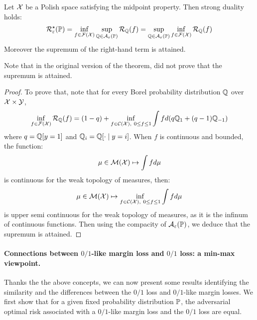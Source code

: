 \begin{thm}
\label{thm:eq01loss}
Let $\mathcal{X}$ be a Polish space satisfying the midpoint property. Then strong duality holds:
\begin{align*}
\mathcal{R}^\star_\varepsilon(\mathbb{P}) = \inf_{f\in\mathcal{F}(\mathcal{X})}\sup_{\mathbb{Q}\in\mathcal{A}_\varepsilon(\mathbb{P})} \mathcal{R}_{\mathbb{Q}}(f) =    \sup_{\mathbb{Q}\in\mathcal{A}_\varepsilon(\mathbb{P})} \inf_{f\in\mathcal{F}(\mathcal{X})} \mathcal{R}_{\mathbb{Q}}(f)
\end{align*}
Moreover the supremum of the right-hand term is attained. 
\end{thm}
Note that in the original version of the theorem, \citet{pydi2021many} did not prove that the supremum is attained. 
\begin{proof}
    To prove that, note that for every Borel probability distribution $\mathbb{Q}$ over $\mathcal{X}\times\mathcal{Y}$,
\begin{align*}
    \inf_{f\in\mathcal{F}(\mathcal{X})} \mathcal{R}_{\mathbb{Q}}(f) = (1-q)+\inf_{f\in\mathcal{C}(\mathcal{X}),~0\leq f\leq 1} \int f d(q\mathbb{Q}_1 +(q-1)\mathbb{Q}_{-1})
\end{align*}
where $q =\mathbb{Q}[y=1]$ and $\mathbb{Q}_i = \mathbb{Q}[\cdot\mid y=i]$. When $f$ is continuous and bounded, the function:
\begin{align*}
   \mu\in\mathcal{M}(\mathcal{X})\mapsto\int f d\mu
\end{align*}
is continuous for the weak topology of measures, then: 
\begin{align*}
    \mu\in\mathcal{M}(\mathcal{X})\mapsto\inf_{f\in\mathcal{C}(\mathcal{X}),~0\leq f\leq 1}\int f d\mu 
\end{align*}
is upper semi continuous for the weak topology of measures, as it is the infinum of continuous functions. Then using the compacity of $\mathcal{A}_\varepsilon(\mathbb{P})$, we deduce that the supremum is attained.
\end{proof}



\paragraph{Connections between $0/1$-like margin loss and $0/1$ loss: a min-max viewpoint.} Thanks the the above concepts, we can now present some results identifying the similarity and the differences between the  $0/1$ loss and $0/1$-like margin losses. We first show that for a given fixed probability distribution $\mathbb{P}$, the adversarial optimal risk associated with a $0/1$-like margin loss and the $0/1$ loss are equal.

